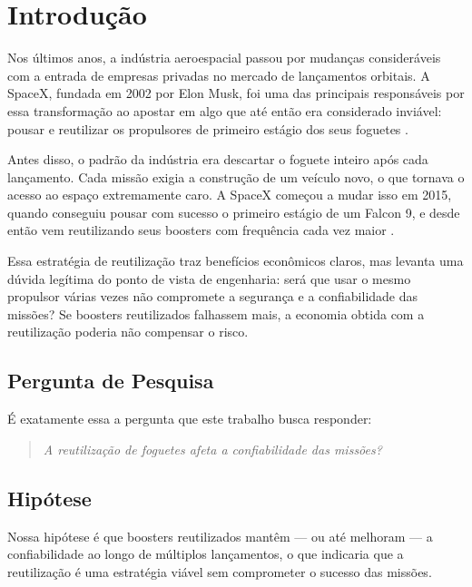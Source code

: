 
\chapter{Introdução}

Nos últimos anos, a indústria aeroespacial passou por mudanças consideráveis com a entrada de empresas privadas no mercado de lançamentos orbitais. A SpaceX, fundada em 2002 por Elon Musk, foi uma das principais responsáveis por essa transformação ao apostar em algo que até então era considerado inviável: pousar e reutilizar os propulsores de primeiro estágio dos seus foguetes \cite{jones2018spacex_reuse}.

Antes disso, o padrão da indústria era descartar o foguete inteiro após cada lançamento. Cada missão exigia a construção de um veículo novo, o que tornava o acesso ao espaço extremamente caro. A SpaceX começou a mudar isso em 2015, quando conseguiu pousar com sucesso o primeiro estágio de um Falcon 9, e desde então vem reutilizando seus boosters com frequência cada vez maior \cite{zapata2017spacex_economics}.

Essa estratégia de reutilização traz benefícios econômicos claros, mas levanta uma dúvida legítima do ponto de vista de engenharia: será que usar o mesmo propulsor várias vezes não compromete a segurança e a confiabilidade das missões? Se boosters reutilizados falhassem mais, a economia obtida com a reutilização poderia não compensar o risco.

\section{Pergunta de Pesquisa}

É exatamente essa a pergunta que este trabalho busca responder:

\begin{quote}
\textit{A reutilização de foguetes afeta a confiabilidade das missões?}
\end{quote}

\section{Hipótese}

Nossa hipótese é que boosters reutilizados mantêm — ou até melhoram — a confiabilidade ao longo de múltiplos lançamentos, o que indicaria que a reutilização é uma estratégia viável sem comprometer o sucesso das missões.

